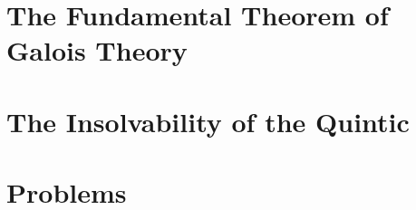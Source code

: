 
\section{The Fundamental Theorem of Galois Theory}

\section{The Insolvability of the Quintic}

\newpage

\section{Problems}

